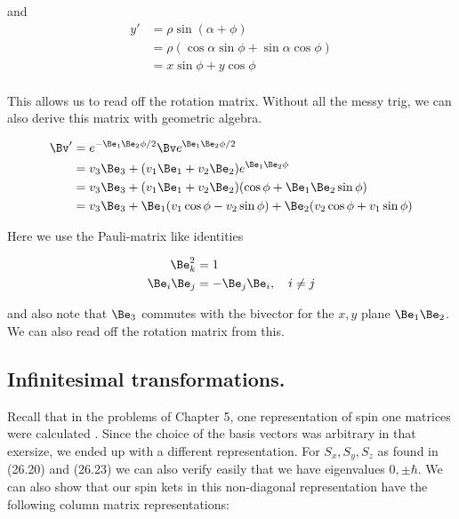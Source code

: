 and
\begin{align*}
y' 
&= \rho \sin(\alpha + \phi) \\
&= \rho (\cos \alpha \sin \phi + \sin \alpha \cos \phi) \\
&= x \sin \phi + y \cos \phi \\
\end{align*}

This allows us to read off the rotation matrix.  Without all the messy trig, we can also derive this matrix with geometric algebra.

\begin{align*}
\Bv' 
&= e^{- \Be_1 \Be_2 \phi/2 } \Bv e^{ \Be_1 \Be_2 \phi/2 } \\
&= v_3 \Be_3 + (v_1 \Be_1 + v_2 \Be_2) e^{ \Be_1 \Be_2 \phi } \\
&= v_3 \Be_3 + (v_1 \Be_1 + v_2 \Be_2) (\cos \phi + \Be_1 \Be_2 \sin\phi) \\
&= v_3 \Be_3 
+ \Be_1 (v_1 \cos\phi - v_2 \sin\phi)
+ \Be_2 (v_2 \cos\phi + v_1 \sin\phi)
\end{align*}

Here we use the Pauli-matrix like identities

\begin{align}\label{eqn:desaiCh26:20}
\Be_k^2 &= 1 \\
\Be_i \Be_j &= -\Be_j \Be_i,\quad i\ne j
\end{align}

and also note that $\Be_3$ commutes with the bivector for the $x,y$ plane $\Be_1 \Be_2$.  We can also read off the rotation matrix from this.

\subsection{Infinitesimal transformations.}

Recall that in the problems of Chapter 5, one representation of spin one matrices were calculated .  Since the choice of the basis vectors was arbitrary in that exersize, we ended up with a different representation.  For $S_x, S_y, S_z$ as found in (26.20) and (26.23) we can also verify easily that we have eigenvalues $0, \pm \hbar$.  We can also show that our spin kets in this non-diagonal representation have the following column matrix representations:

